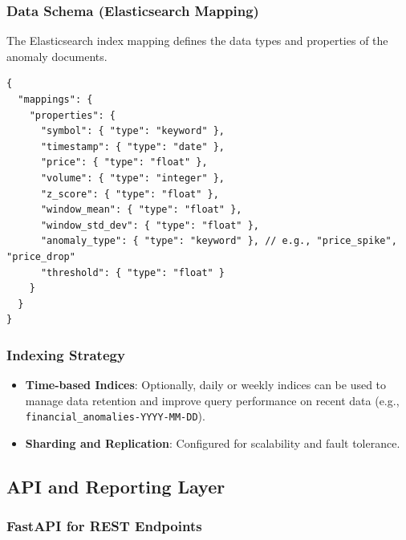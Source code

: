 \subsubsection{Data Schema (Elasticsearch Mapping)}

The Elasticsearch index mapping defines the data types and properties of the anomaly documents.
\begin{verbatim}
{
  "mappings": {
    "properties": {
      "symbol": { "type": "keyword" },
      "timestamp": { "type": "date" },
      "price": { "type": "float" },
      "volume": { "type": "integer" },
      "z_score": { "type": "float" },
      "window_mean": { "type": "float" },
      "window_std_dev": { "type": "float" },
      "anomaly_type": { "type": "keyword" }, // e.g., "price_spike", "price_drop"
      "threshold": { "type": "float" }
    }
  }
}
\end{verbatim}

\subsubsection{Indexing Strategy}
\begin{itemize}
    \item \textbf{Time-based Indices}: Optionally, daily or weekly indices can be used to manage data retention and improve query performance on recent data (e.g., \texttt{financial\_anomalies-YYYY-MM-DD}).
    \item \textbf{Sharding and Replication}: Configured for scalability and fault tolerance.
\end{itemize}
\subsection{API and Reporting Layer}

\subsubsection{FastAPI for REST Endpoints}

